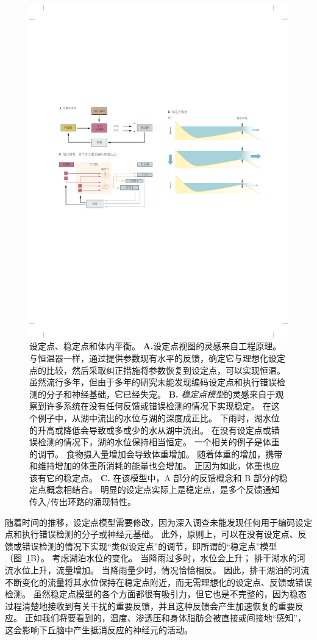 \begin{figure}[htbp]
	\centering
	\includegraphics[width=0.9\linewidth]{chap41/fig_41_1}
	\caption{设定点、稳定点和体内平衡。
		\textbf{A.}设定点视图的灵感来自工程原理。
		与恒温器一样，通过提供参数现有水平的反馈，确定它与理想化设定点的比较，然后采取纠正措施将参数恢复到设定点，可以实现恒温。
		虽然流行多年，但由于多年的研究未能发现编码设定点和执行错误检测的分子和神经基础，它已经失宠。
		\textbf{B.} \textit{稳定点模型}的灵感来自于观察到许多系统在没有任何反馈或错误检测的情况下实现稳定。
		在这个例子中，从湖中流出的水位与湖的深度成正比。
		下雨时，湖水位的升高或降低会导致或多或少的水从湖中流出。
		在没有设定点或错误检测的情况下，湖的水位保持相当恒定。
		一个相关的例子是体重的调节。
		食物摄入量增加会导致体重增加。 随着体重的增加，携带和维持增加的体重所消耗的能量也会增加。
		正因为如此，体重也应该有它的稳定点\cite{speakman2011set}。
		\textbf{C.} 在该模型中，A 部分的反馈概念和 B 部分的稳定点概念相结合。
		明显的设定点实际上是稳定点，是多个反馈通知传入/传出环路的涌现特性。}
	\label{fig:41_1}
\end{figure}


随着时间的推移，设定点模型需要修改，因为深入调查未能发现任何用于编码设定点和执行错误检测的分子或神经元基础。
此外，原则上，可以在没有设定点、反馈或错误检测的情况下实现“类似设定点”的调节，即所谓的“稳定点”模型（图~\ref{fig:41_1}B）。
考虑湖泊水位的变化。
当降雨过多时，水位会上升；
排干湖水的河流水位上升，流量增加。
当降雨量少时，情况恰恰相反。
因此，排干湖泊的河流不断变化的流量将其水位保持在稳定点附近，而无需理想化的设定点、反馈或错误检测。
虽然稳定点模型的各个方面都很有吸引力，但它也是不完整的，因为稳态过程清楚地接收到有关干扰的重要反馈，并且这种反馈会产生加速恢复的重要反应。
正如我们将要看到的，温度、渗透压和身体脂肪会被直接或间接地“感知”，这会影响下丘脑中产生抵消反应的神经元的活动。


